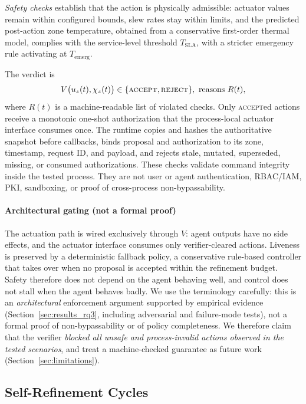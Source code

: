 \documentclass[smartcities,article,submit,moreauthors]{Definitions/mdpi}
\begin{document}
\emph{Safety checks} establish that the action is physically
admissible: actuator values remain within configured bounds, slew rates
stay within limits, and the predicted post-action zone temperature,
obtained from a conservative first-order thermal model, complies with the
service-level threshold $T_{\mathrm{SLA}}$, with a stricter emergency
rule activating at $T_{\mathrm{emerg}}$.

The verdict is
\begin{equation}
V\bigl(u_z(t),\chi_z(t)\bigr)\in\{\textsc{accept},\textsc{reject}\},
\ \text{reasons } R(t),
\label{eq:verdict}
\end{equation}
where $R(t)$ is a machine-readable list of violated checks. Only
\textsc{accept}ed actions receive a monotonic one-shot authorization that the
process-local actuator interface consumes once. The runtime copies and hashes
the authoritative snapshot before callbacks, binds proposal and authorization
to its zone, timestamp, request ID, and payload, and rejects stale, mutated,
superseded, missing, or consumed authorizations. These checks validate command
integrity inside the tested process. They are not user or agent authentication,
RBAC/IAM, PKI, sandboxing, or proof of cross-process non-bypassability.

\paragraph{Architectural gating (not a formal proof)}
The actuation path is wired exclusively through $V$: agent outputs have
no side effects, and the actuator interface consumes only
verifier-cleared actions. Liveness is preserved by a deterministic
fallback policy, a conservative rule-based controller that takes over
when no proposal is accepted within the refinement budget. Safety
therefore does not depend on the agent behaving well, and control does
not stall when the agent behaves badly. We use the terminology
carefully: this is an \emph{architectural} enforcement argument supported
by empirical evidence (Section~\ref{sec:results_rq3}, including
adversarial and failure-mode tests), not a formal proof of
non-bypassability or of policy completeness. We therefore claim that the
verifier \emph{blocked all unsafe and process-invalid actions observed in
the tested scenarios}, and treat a machine-checked guarantee as future
work (Section~\ref{sec:limitations}).

\subsection{Self-Refinement Cycles}
\label{sec:refinement}
\end{document}
